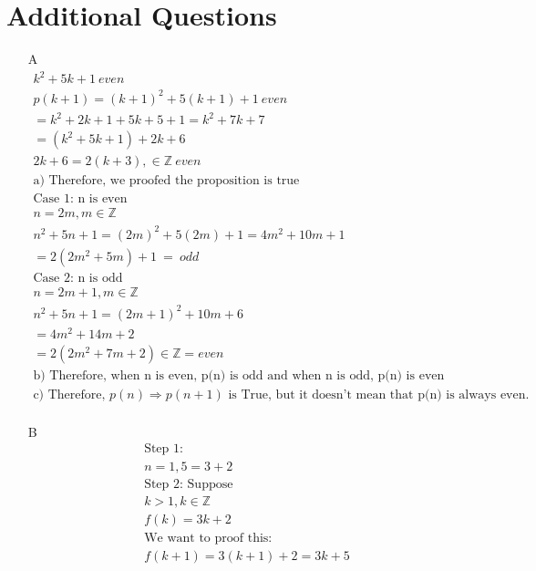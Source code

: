 \documentclass[12pt]{article}
\begin{document}
\section*{Additional Questions}
\begin{itemize}
    \item [A] 
	\begin{equation*}
		\begin{split}
		    k^2 + 5k + 1\ even\\
		    p(k+1) = (k+1)^2 + 5(k +1) + 1\ even\\
		    =k^2 + 2k + 1 + 5k +5 + 1 = k^2 + 7k + 7\\
		    = (k^2 + 5k + 1) + 2k + 6\\
		    2k+ 6 = 2(k + 3), \in \mathbb{Z}\ even\\
		    \text{a) Therefore, we proofed the proposition is true}\\
		    \text{Case 1: n is even}\\
		    n = 2m, m \in \mathbb{Z}\\
		    n^2 + 5n + 1 = (2m)^2 + 5(2m) + 1 = 4m^2 + 10m + 1\\
		    = 2(2m^2 + 5m) + 1\ =\ odd\\
		    \text{Case 2: n is odd}\\
		    n = 2m + 1, m \in \mathbb{Z}\\
		    n^2 + 5n + 1 = (2m+1)^2 + 10m + 6\\
		    = 4m^2 + 14m + 2\\
		    = 2(2m^2 + 7m + 2) \in \mathbb{Z} = even\\
		    \text{b) Therefore, when n is even, p(n) is odd and when n is odd, p(n) is even}\\
		    \text{c) Therefore, $p(n) \Rightarrow p(n+1)$ is True, but it doesn't mean that p(n) is always even.}\\
		\end{split}
	\end{equation*}
    \item [B] 
	\begin{equation*}
		\begin{split}
		    \text{Step 1:}\\
		    n = 1, 5 = 3+2\\
		    \text{Step 2: Suppose}\\
		    k > 1, k \in \mathbb{Z}\\
		    f(k) = 3k+2\\
		    \text{We want to proof this:}\\
		    f(k+1) = 3(k+1)+2 = 3k + 5\\

\end{split}
\end{equation*}
\end{itemize}
\end{document}
